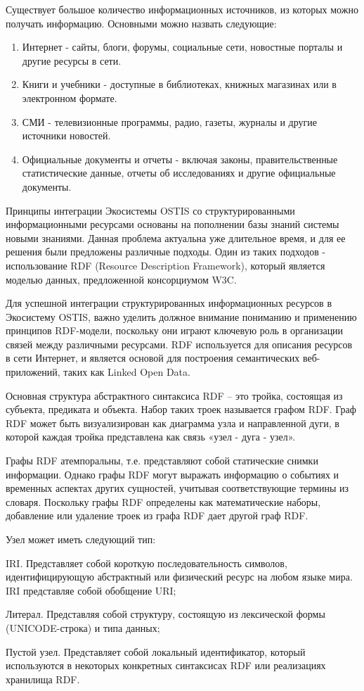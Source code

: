 Существует большое количество информационных источников, из которых можно получать информацию. Основными можно назвать следующие:
\begin{enumerate}
    \item Интернет - сайты, блоги, форумы, социальные сети, новостные порталы и другие ресурсы в сети.
    \item Книги и учебники - доступные в библиотеках, книжных магазинах или в электронном формате.
    \item СМИ - телевизионные программы, радио, газеты, журналы и другие источники новостей.
    \item Официальные документы и отчеты - включая законы, правительственные статистические данные, отчеты об исследованиях и другие официальные документы.
\end{enumerate}

Принципы интеграции Экосистемы OSTIS со структурированными информационными ресурсами основаны на пополнении базы знаний системы новыми знаниями. Данная проблема актуальна уже длительное время, и для ее решения были предложены различные подходы. Один из таких подходов - использование RDF (Resource Description Framework), который является моделью данных, предложенной консорциумом W3C.

Для успешной интеграции структурированных информационных ресурсов в Экосистему OSTIS, важно уделить должное внимание пониманию и применению принципов RDF-модели, поскольку они играют ключевую роль в организации связей между различными ресурсами. RDF используется для описания ресурсов в сети Интернет, и является основой для построения семантических веб-приложений, таких как Linked Open Data.

Основная структура абстрактного синтаксиса RDF – это тройка, состоящая из субъекта, предиката и объекта. Набор таких троек называется графом RDF. Граф RDF может быть визуализирован как диаграмма узла и направленной дуги, в которой каждая тройка представлена как связь «узел - дуга - узел».

Графы RDF атемпоральны, т.е. представляют собой статические снимки информации. Однако графы RDF могут выражать информацию о событиях и временных аспектах других сущностей, учитывая соответствующие термины из словаря. Поскольку графы RDF определены как математические наборы, добавление или удаление троек из графа RDF дает другой граф RDF.

Узел может иметь следующий тип:
\begin{textitemize}
    \item IRI. Представляет собой короткую последовательность символов, идентифицирующую абстрактный или физический ресурс на любом языке мира. IRI представляе собой обобщение URI;
    \item Литерал. Представляя собой структуру, состоящую из лексической формы (UNICODE-строка) и типа данных;
    \item Пустой узел. Представляет собой локальный идентификатор, который используются в некоторых конкретных синтаксисах RDF или реализациях хранилища RDF.
\end{textitemize}

